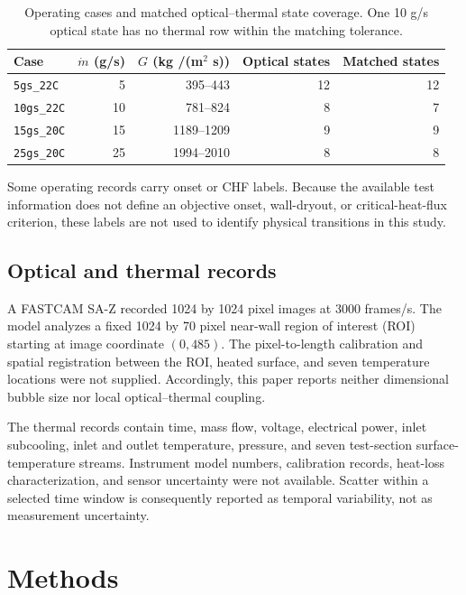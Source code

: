 \documentclass[preprint,12pt,sort&compress]{elsarticle}
\begin{document}
\begin{table}[htbp]
  \centering
  \caption{Operating cases and matched optical--thermal state coverage. One 10 g/s optical state has no thermal row within the matching tolerance.}
  \label{tab:test-matrix}
  \begin{tabular}{lrrrr}
    \toprule
    Case & $\dot m$ (g/s) & $G$ (kg /(m$^2$ s)) & Optical states & Matched states \\
    \midrule
    \texttt{5gs\_22C}  & 5  & 395--443   & 12 & 12 \\
    \texttt{10gs\_22C} & 10 & 781--824   & 8  & 7 \\
    \texttt{15gs\_20C} & 15 & 1189--1209 & 9  & 9 \\
    \texttt{25gs\_20C} & 25 & 1994--2010 & 8  & 8 \\
    \bottomrule
  \end{tabular}
\end{table}

Some operating records carry onset or CHF labels. Because the available test information does not define an objective onset, wall-dryout, or critical-heat-flux criterion, these labels are not used to identify physical transitions in this study.

\subsection{Optical and thermal records}

A FASTCAM SA-Z recorded 1024 by 1024 pixel images at 3000 frames/s. The model analyzes a fixed 1024 by 70 pixel near-wall region of interest (ROI) starting at image coordinate $(0,485)$. The pixel-to-length calibration and spatial registration between the ROI, heated surface, and seven temperature locations were not supplied. Accordingly, this paper reports neither dimensional bubble size nor local optical--thermal coupling.

The thermal records contain time, mass flow, voltage, electrical power, inlet subcooling, inlet and outlet temperature, pressure, and seven test-section surface-temperature streams. Instrument model numbers, calibration records, heat-loss characterization, and sensor uncertainty were not available. Scatter within a selected time window is consequently reported as temporal variability, not as measurement uncertainty.

\section{Methods}
\end{document}
